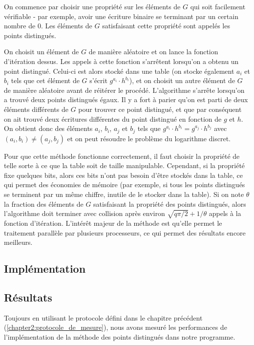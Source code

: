       On commence par choisir une propriété sur les éléments de $G$ qui soit facilement vérifiable - par exemple, avoir une écriture binaire se terminant par un certain nombre de $0$. Les éléments de $G$ satisfaisant cette propriété sont appelés les points distingués.

      On choisit un élément de $G$ de manière aléatoire et on lance la fonction d'itération dessus. Les appels à cette fonction s'arrêtent lorsqu'on a obtenu un point distingué. Celui-ci est alors stocké dans une table (on stocke également $a_i$ et $b_i$ tels que cet élément de $G$ s'écrit $g^{a_i} \cdot h^{b_i}$), et on choisit un autre élément de $G$ de manière aléatoire avant de réitérer le procédé. L'algorithme s'arrête lorsqu'on a trouvé deux points distingués égaux. Il y a fort à parier qu'on est parti de deux éléments différents de $G$ pour trouver ce point distingué, et que par conséquent on ait trouvé deux écritures différentes du point distingué en fonction de $g$ et $h$. On obtient donc des éléments $a_i$, $b_i$, $a_j$ et $b_j$ tels que $g^{a_i} \cdot h^{b_i} = g^{a_j} \cdot h^{b_j}$ avec $(a_i,b_i) \neq (a_j,b_j)$ et on peut résoudre le problème du logarithme discret.

      Pour que cette méthode fonctionne correctement, il faut choisir la propriété de telle sorte à ce que la table soit de taille manipulable. Cependant, si la propriété fixe quelques bits, alors ces bits n'ont pas besoin d'être stockés dans la table, ce qui permet des économies de mémoire (par exemple, si tous les points distingués se terminent par un même chiffre, inutile de le stocker dans la table). Si on note $\theta$ la fraction des éléments de $G$ satisfaisant la propriété des points distingués, alors l'algorithme doit terminer avec collision après environ $\sqrt{q\pi/2} + 1/\theta$ appels à la fonction d'itération. L'intérêt majeur de la méthode est qu'elle permet le traitement parallèle par plusieurs processeurs, ce qui permet des résultats encore meilleurs.

      \subsection{Implémentation}
      \subsection{Résultats}
      Toujours en utilisant le protocole défini dans le chapitre précédent (\ref{chapter2:protocole_de_mesure}), nous avons mesuré les performances de l'implémentation de la méthode des points distingués dans notre programme.

